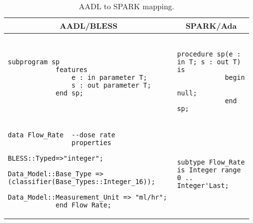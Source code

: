 \begin{table}[!ht]
	\caption{AADL to SPARK mapping.}
	\centering
  	\begin{tabular}{ | p{3in} | p{3in} |}

		\hline
		\multicolumn{1}{|c|}{\textbf{AADL/BLESS}} & \multicolumn{1}{|c|}{\textbf{SPARK/Ada}} \\ \hline

		\begin{lstlisting}[language=aadl]
			subprogram sp
			features
				e : in parameter T;
				s : out parameter T;
			end sp;
		\end{lstlisting} 
		& 
		\begin{lstlisting}
			procedure sp(e : in T; s : out T) is 
			begin
				null;
			end sp;
		\end{lstlisting} 

		\\ \hline

		\begin{lstlisting}[language=aadl]
			data Flow_Rate  --dose rate
  				properties
    				BLESS::Typed=>"integer";
    				Data_Model::Base_Type => (classifier(Base_Types::Integer_16));
    				Data_Model::Measurement_Unit => "ml/hr";
			end Flow_Rate;
		\end{lstlisting} 
		& 
		\begin{lstlisting}
			subtype Flow_Rate is Integer range 0 .. Integer'Last;
		\end{lstlisting} 

		\\ \hline
	\end{tabular}
\end{table}

